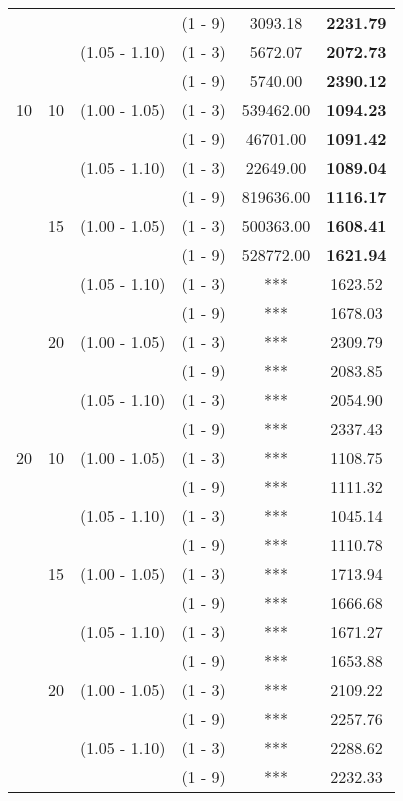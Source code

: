 \documentclass[a4paper,11pt]{article}
\begin{document}
\begin{table}[!ht]
\begin{tabular}{|c|c|c|c|c|c|}
   &    &  & (1 - 9) & 3093.18 & \textbf{2231.79} \\
   &    & (1.05 - 1.10) & (1 - 3) & 5672.07 & \textbf{2072.73} \\
   &    &  & (1 - 9) & 5740.00 & \textbf{2390.12} \\
10 & 10 & (1.00 - 1.05) & (1 - 3) & 539462.00 & \textbf{1094.23} \\
   &    &  & (1 - 9) & 46701.00 & \textbf{1091.42} \\
   &    & (1.05 - 1.10) & (1 - 3) & 22649.00 & \textbf{1089.04} \\
   &    &  & (1 - 9) & 819636.00 & \textbf{1116.17} \\
   & 15 & (1.00 - 1.05) & (1 - 3) & 500363.00 & \textbf{1608.41} \\
   &    &  & (1 - 9) & 528772.00 & \textbf{1621.94} \\
   &    & (1.05 - 1.10) & (1 - 3) & *** & 1623.52 \\
   &    &  & (1 - 9) & *** & 1678.03 \\
   & 20 & (1.00 - 1.05) & (1 - 3) & *** & 2309.79 \\
   &    &  & (1 - 9) & *** & 2083.85 \\
   &    & (1.05 - 1.10) & (1 - 3) & *** & 2054.90 \\
   &    &  & (1 - 9) & *** & 2337.43 \\
20 & 10 & (1.00 - 1.05) & (1 - 3) & *** & 1108.75 \\
   &    &  & (1 - 9) & *** & 1111.32 \\
   &    & (1.05 - 1.10) & (1 - 3) & *** & 1045.14 \\
   &    &  & (1 - 9) & *** & 1110.78 \\
   & 15 & (1.00 - 1.05) & (1 - 3) & *** & 1713.94 \\
   &    &  & (1 - 9) & *** & 1666.68 \\
   &    & (1.05 - 1.10) & (1 - 3) & *** & 1671.27 \\
   &    &  & (1 - 9) & *** & 1653.88 \\
   & 20 & (1.00 - 1.05) & (1 - 3) & *** & 2109.22 \\
   &    &  & (1 - 9) & *** & 2257.76 \\
   &    & (1.05 - 1.10) & (1 - 3) & *** & 2288.62 \\
   &    &  & (1 - 9) & *** & 2232.33 \\


\hline

\end{tabular}
\end{table}
\end{document}
